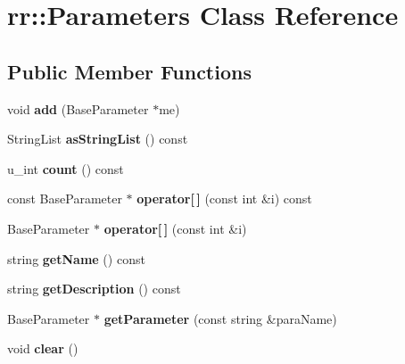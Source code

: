 \hypertarget{classrr_1_1_parameters}{\section{rr\-:\-:Parameters Class Reference}
\label{classrr_1_1_parameters}
}
\subsection*{Public Member Functions}
\begin{DoxyCompactItemize}
\item 
\hypertarget{classrr_1_1_parameters_aa5e227494007b6f88d835846a54e22eb}{void {\bfseries add} (Base\-Parameter $\ast$me)}\label{classrr_1_1_parameters_aa5e227494007b6f88d835846a54e22eb}

\item 
\hypertarget{classrr_1_1_parameters_ab55bd5d8be96ef757a4b8b78052c4179}{String\-List {\bfseries as\-String\-List} () const }\label{classrr_1_1_parameters_ab55bd5d8be96ef757a4b8b78052c4179}

\item 
\hypertarget{classrr_1_1_parameters_a0b6777ab2c1961bd01250bcfba09b027}{u\-\_\-int {\bfseries count} () const }\label{classrr_1_1_parameters_a0b6777ab2c1961bd01250bcfba09b027}

\item 
\hypertarget{classrr_1_1_parameters_af87492ce50e57bd9c016558917021a9c}{const Base\-Parameter $\ast$ {\bfseries operator\mbox{[}$\,$\mbox{]}} (const int \&i) const }\label{classrr_1_1_parameters_af87492ce50e57bd9c016558917021a9c}

\item 
\hypertarget{classrr_1_1_parameters_ade930928549434df313091cee2b6369c}{Base\-Parameter $\ast$ {\bfseries operator\mbox{[}$\,$\mbox{]}} (const int \&i)}\label{classrr_1_1_parameters_ade930928549434df313091cee2b6369c}

\item 
\hypertarget{classrr_1_1_parameters_ac358ba12212134129ac470b009d19cd0}{string {\bfseries get\-Name} () const }\label{classrr_1_1_parameters_ac358ba12212134129ac470b009d19cd0}

\item 
\hypertarget{classrr_1_1_parameters_ab5fe14ffcdeb149a3f878aa4c0e80445}{string {\bfseries get\-Description} () const }\label{classrr_1_1_parameters_ab5fe14ffcdeb149a3f878aa4c0e80445}

\item 
\hypertarget{classrr_1_1_parameters_ac63f40190daffcbf47f231fc9bdd95af}{Base\-Parameter $\ast$ {\bfseries get\-Parameter} (const string \&para\-Name)}\label{classrr_1_1_parameters_ac63f40190daffcbf47f231fc9bdd95af}

\item 
\hypertarget{classrr_1_1_parameters_a084b2f9cf606c39ff3080ad39bfae3b0}{void {\bfseries clear} ()}\label{classrr_1_1_parameters_a084b2f9cf606c39ff3080ad39bfae3b0}

\end{DoxyCompactItemize}
